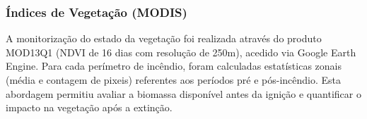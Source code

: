 \subsubsection{Índices de Vegetação (MODIS)}
A monitorização do estado da vegetação foi realizada através do produto MOD13Q1 (NDVI de 16 dias com resolução de 250m), acedido via Google Earth Engine.
Para cada perímetro de incêndio, foram calculadas estatísticas zonais (média e contagem de pixeis) referentes aos períodos pré e pós-incêndio. Esta abordagem permitiu avaliar a biomassa disponível antes da ignição e quantificar o impacto na vegetação após a extinção.